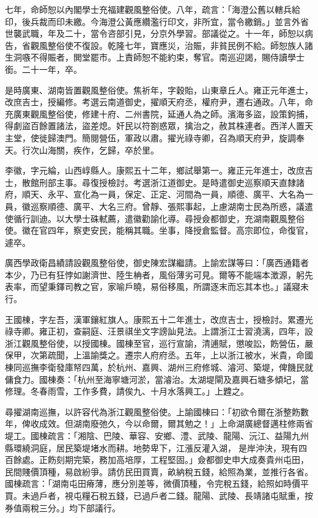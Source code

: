 \begin{pinyinscope}
七年，命師恕以內閣學士充福建觀風整俗使。八年，疏言：「海澄公舊以轄兵給印，後兵裁而印未繳。今海澄公黃應纘濫行印文，非所宜，當令繳銷。」並言外省世襲武職，年及二十，當令咨部引見，分京外學習。部議從之。十一年，師恕以病告，省觀風整俗使不復設。乾隆七年，寶應災，治賑，非貧民例不給。師恕族人諸生洞嗾不得賑者，閧堂罷市。上責師恕不能約束，奪官。南巡迎謁，賜侍讀學士銜。二十一年，卒。

是時廣東、湖南皆置觀風整俗使。焦祈年，字穀貽，山東章丘人。雍正元年進士，改庶吉士，授編修。考選云南道御史，擢順天府丞，權府尹，遷右通政。八年，命充廣東觀風整俗使，修建十府、二州書院，延通人為之師。濱海多盜，設策鉤捕，得劇盜百餘置諸法，盜差熄。奸民以符劄惑眾，擒治之，赦其株連者。西洋人置天主堂，使徙歸澳門。簡閱營伍，軍政以肅。擢光祿寺卿，召為順天府尹，旋調奉天。行次山海關，疾作，乞歸，卒於里。

李徽，字元綸，山西崞縣人。康熙五十二年，鄉試舉第一。雍正元年進士，改庶吉士，散館刑部主事。尋復授檢討。考選浙江道御史。是時遣御史巡察順天直隸諸府，順天、永平、宣化為一員，保定、正定、河間為一員，順德、廣平、大名為一員，徽巡察順德、廣平、大名三府。曾靜、張熙事起，上慮湖南士民為所惑，議遣使循行訓迪。以大學士硃軾薦，遣徽勸諭化導。尋授僉都御史，充湖南觀風整俗使。徽在官四年，察吏安民，能稱其職。坐事，降授倉監督。高宗即位，命復官，遽卒。

廣西學政衛昌績請設觀風整俗使，御史陳宏謀繼請。上諭宏謀等曰：「廣西通籍者本少，乃已有狂悖如謝濟世、陸生柟者，風俗薄劣可見。爾等不能端本澂源，躬先表率，而望秉鐸司教之官，家喻戶曉，易俗移風，所謂逐末而忘其本也。」議寢未行。

王國棟，字左吾，漢軍鑲紅旗人。康熙五十二年進士，改庶吉士，授檢討。累遷光祿寺卿。雍正初，查嗣庭、汪景祺坐文字謗訕見法。上謂浙江士習澆漓，四年，設浙江觀風整俗使，以授國棟。國棟至官，巡行宣諭，清逋賦，懲唆訟，飭營伍，嚴保甲，次第疏聞，上溫諭獎之。遷宗人府府丞。五年，上以浙江被水，米貴，命國棟同巡撫李衛發庫帑四萬，於杭州、嘉興、湖州三府修城、濬河、築堤，俾饑民就傭食力。國棟奏：「杭州至海寧塘河淤，當濬治。太湖堤閘及嘉興石塘多傾圮，當修理。冬春雨雪，工作多費，請俟九、十月水落興工。」上韙之。

尋擢湖南巡撫，以許容代為浙江觀風整俗使。上諭國棟曰：「初欲令爾在浙整飭數年，俾收成效。但湖南廢弛久，今以命爾，爾其勉之！」上命湖廣總督邁柱修兩省堤工。國棟疏言：「湘陰、巴陵、華容、安鄉、澧、武陵、龍陽、沅江、益陽九州縣環繞洞庭，居民築堤堵水而耕。地勢卑下，江漲反灌入湖，是岸沖決，現有四百餘處。正飭刻期完築，務加高培厚，工程堅固。」僉都御史申大成奏貴州屯田，民間賤價頂種，易啟紛爭。請仿民田買賣，畝納稅五錢，給照為業，並推行各省。國棟疏言：「湖南屯田瘠薄，應分別差等，微價頂種，令完稅五錢，給照如時價平買。未過戶者，視屯糧石稅五錢，已過戶者二錢。龍陽、武陵、長靖諸屯賦重，按券值兩稅三分。」均下部議行。


\end{pinyinscope}
